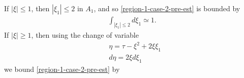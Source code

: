\documentclass[12pt,reqno]{amsart}
\numberwithin{equation}{section}  %
\numberwithin{figure}{section}
\newcommand{\rr}{\mathbb{R}}
\theoremstyle{plain}
\theoremstyle{definition}
\theoremstyle{remark}
\begin{document}
%
%
If $| \xi  | \le 1$, then $| \xi_{1} | \le 2$ in $A_{1}$, and so
\eqref{region-1-case-2-pre-est} is bounded by
%
%
\begin{equation*}
\begin{split}
  \int_{| \xi_{1} | \le 2} d \xi_{1} \simeq 1.
\end{split}
\end{equation*}
%
%
If $| \xi | \ge 1$, then using the change of variable
%
%
\begin{equation*}
\begin{split}
  & \eta = \tau - \xi^{2} + 2 \xi \xi_{1}
  \\
  & d \eta = 2 \xi d \xi_{1}
\end{split}
\end{equation*}
%
%
we bound \eqref{region-1-case-2-pre-est} by
 
\end{document}
